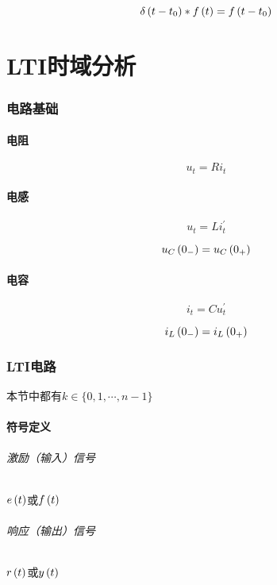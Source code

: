 \documentclass{article}
\begin{document}
\[\delta\left(t-t_0\right)\ast f\left(t\right)=f\left(t-t_0\right)\]

\part{LTI时域分析}

\section{电路基础}

\subsection{电阻}

\[u_t=Ri_t\]

\subsection{电感}

\[u_t=Li_t^\prime\]

\[u_C\left(0_-\right)=u_C\left(0_+\right)\]

\subsection{电容}

\[i_t=Cu_t^\prime\]

\[i_L\left(0_-\right)=i_L\left(0_+\right)\]

\section{LTI电路}

本节中都有$k\in\{0,1,\cdots,n-1\}$

\subsection{符号定义}

\paragraph{激励（输入）信号}

$e\left(t\right)$或$f\left(t\right)$

\paragraph{响应（输出）信号}

$r\left(t\right)$或$y\left(t\right)$
\end{document}
